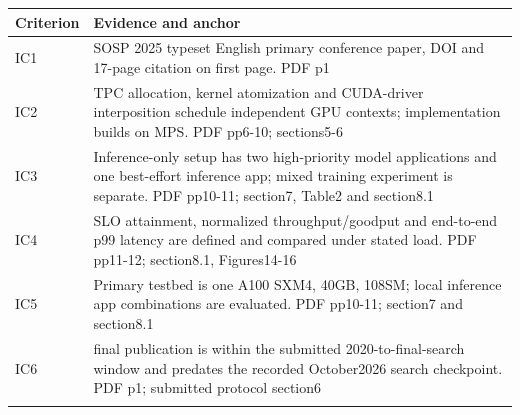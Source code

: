 \begin{longtable}{>{\raggedright\arraybackslash}p{}>{\raggedright\arraybackslash}p{}}
\toprule
\textbf{Criterion} & \textbf{Evidence and anchor}\\\midrule\endhead
IC1 & SOSP 2025 typeset English primary conference paper,\allowbreak{} DOI and 17-page citation on first page. PDF p1\\\addlinespace
IC2 & TPC allocation,\allowbreak{} kernel atomization and CUDA-driver interposition schedule independent GPU contexts;\allowbreak{} implementation builds on MPS. PDF pp6-10;\allowbreak{} sections5-6\\\addlinespace
IC3 & Inference-only setup has two high-priority model applications and one best-effort inference app;\allowbreak{} mixed training experiment is separate. PDF pp10-11;\allowbreak{} section7,\allowbreak{} Table2 and section8.1\\\addlinespace
IC4 & SLO attainment,\allowbreak{} normalized throughput/goodput and end-to-end p99 latency are defined and compared under stated load. PDF pp11-12;\allowbreak{} section8.1,\allowbreak{} Figures14-16\\\addlinespace
IC5 & Primary testbed is one A100 SXM4,\allowbreak{} 40GB,\allowbreak{} 108SM;\allowbreak{} local inference app combinations are evaluated. PDF pp10-11;\allowbreak{} section7 and section8.1\\\addlinespace
IC6 & 2025 final publication is within the submitted 2020-to-final-search window and predates the recorded October2026 search checkpoint. PDF p1;\allowbreak{} submitted protocol section6\\\addlinespace
\bottomrule\end{longtable}
